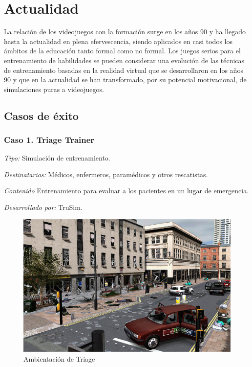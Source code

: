 \section{Actualidad}
\label{sec:tics_ACTUALIDAD}

La relación de los videojuegos con la formación surge en los años 90 y ha
llegado hasta la actualidad en plena efervescencia, siendo aplicados en casi
todos los ámbitos de la educación tanto formal como no formal. Los juegos serios
para el entrenamiento de habilidades se pueden considerar una evolución de las
técnicas de entrenamiento basadas en la realidad virtual que se desarrollaron en
los años 90 y que en la actualidad se han transformado, por su potencial
motivacional, de simulaciones puras a
videojuegos\cite{videojuegos:gonzaleztardon}.

\subsection{Casos de éxito}


\subsubsection{Caso 1. Triage Trainer}
	

\emph{Tipo: } Simulación de entrenamiento.

\emph{Destinatarios: } Médicos, enfermeros, paramédicos y otros rescatistas.

\emph{Contenido} Entrenamiento para evaluar a los pacientes en un lugar de
emergencia.

\emph{Desarrollado por: } TruSim.

\begin{figure}[h!] 
	\centering 
	\includegraphics[scale=0.5]{tics/images/triage.png}
	\caption{Ambientación de Triage}
	\label{fig:triage}
\end{figure}

